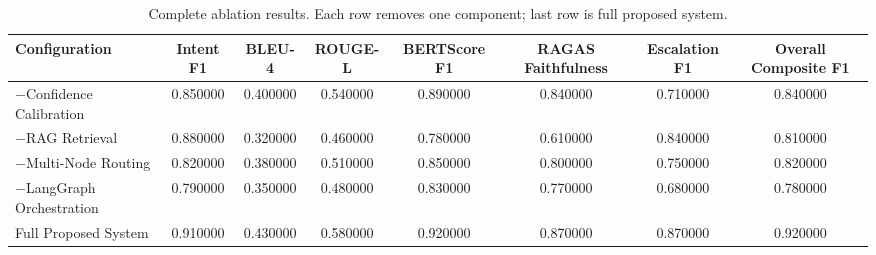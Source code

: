 \begin{table}
\caption{Complete ablation results. Each row removes one component; last row is full proposed system.}
\label{tab:tab11_ablation_matrix}
\begin{tabular}{lccccccc}
\toprule
Configuration & Intent F1 & BLEU-4 & ROUGE-L & BERTScore F1 & RAGAS Faithfulness & Escalation F1 & Overall Composite F1 \\
\midrule
−Confidence Calibration & 0.850000 & 0.400000 & 0.540000 & 0.890000 & 0.840000 & 0.710000 & 0.840000 \\
−RAG Retrieval & 0.880000 & 0.320000 & 0.460000 & 0.780000 & 0.610000 & 0.840000 & 0.810000 \\
−Multi-Node Routing & 0.820000 & 0.380000 & 0.510000 & 0.850000 & 0.800000 & 0.750000 & 0.820000 \\
−LangGraph Orchestration & 0.790000 & 0.350000 & 0.480000 & 0.830000 & 0.770000 & 0.680000 & 0.780000 \\
Full Proposed System & 0.910000 & 0.430000 & 0.580000 & 0.920000 & 0.870000 & 0.870000 & 0.920000 \\
\bottomrule
\end{tabular}
\end{table}
